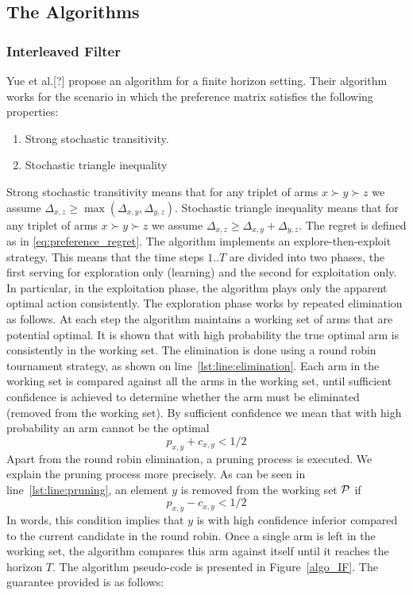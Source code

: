 \documentclass{llncs}
\begin{document}
	\subsection{The Algorithms}
\subsubsection{Interleaved Filter}
	Yue et al.[?] propose an algorithm for a finite horizon setting. 
	Their algorithm works for the scenario in which the preference matrix satisfies the following properties:

	\begin{enumerate}

		\item Strong stochastic transitivity.

		\item Stochastic triangle inequality

	\end{enumerate}
	Strong stochastic transitivity means that for any triplet of arms $x \succ y \succ z$ we assume $\Delta_{x,z} \geq \max(\Delta_{x,y},\Delta_{y,z})$.
	Stochastic triangle inequality means that for any triplet of arms $x \succ y \succ z$ we assume $\Delta_{x,z} \geq \Delta_{x,y} + \Delta_{y,z}$.
	The regret is defined as in \eqref{eq:preference_regret}.
	The algorithm implements an explore-then-exploit strategy. 
	This means that the time steps $1..T$ are divided into two phases, the first serving for exploration only (learning) and the second for exploitation only. 
	In particular, in the exploitation phase, the algorithm plays only the apparent optimal action consistently.
	The exploration phase works by repeated elimination as follows. 
	At each step the algorithm maintains a working set of arms that are potential optimal. 
	It is shown that with high probability the true optimal arm is consistently in the working set. 
	The elimination is done using a round robin tournament strategy, as shown on line~\ref{lst:line:elimination}. 
	Each arm in the working set is compared against all the arms in the working set, until sufficient confidence is achieved to determine whether the arm must be eliminated (removed from the working set). 
	By sufficient confidence we mean that with high probability an arm cannot be the optimal $$p_{x,y}+c_{x,y}<1/2$$
	Apart from the round robin elimination, a pruning process is executed.
	We explain the pruning process more precisely. 
	As can be seen in line~\ref{lst:line:pruning}, an element $y$ is removed from the working set $\cal P$ if $$p_{x,y}-c_{x,y}<1/2$$ 
	In words, this condition implies that $y$ is with high confidence inferior compared to the current candidate in the round robin.
	Once a single arm is left in the working set, the algorithm compares this arm against itself until it reaches the horizon $T$.
	The algorithm pseudo-code is presented in Figure~\ref{algo_IF}. 
	The guarantee provided is as follows:
\end{document}
